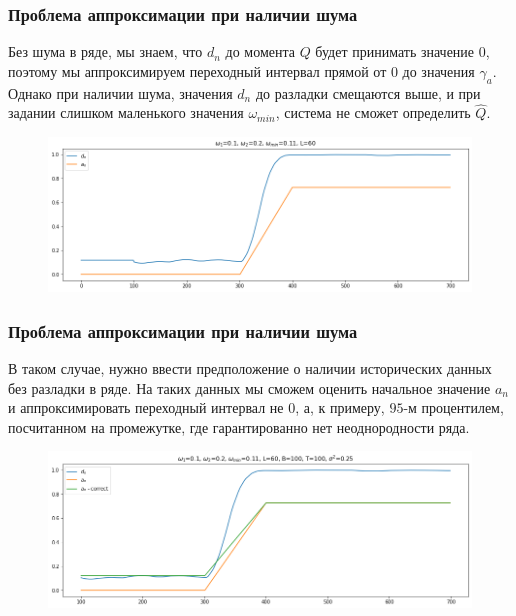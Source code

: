 \documentclass[11pt]{beamer}
\begin{document}
	\begin{frame}
		\frametitle{Проблема аппроксимации при наличии шума}
		Без шума в ряде, мы знаем, что $ d_{n} $ до момента $ Q $ будет принимать значение $ 0 $, поэтому мы аппроксимируем переходный интервал прямой от $ 0 $ до значения $ \gamma_a $. Однако при наличии шума, значения $ d_{n} $ до разладки смещаются выше, и при задании слишком маленького значения $ \omega_{min} $, система не сможет определить $ \hat{Q} $. 
		
		\begin{figure}[b]
			\centering
			\includegraphics[width=\linewidth]{imgs/noise_existance_problem.png}
		\end{figure}
	\end{frame}

	\begin{frame}
		\frametitle{Проблема аппроксимации при наличии шума}
		В таком случае, нужно ввести предположение о наличии исторических данных без разладки в ряде. На таких данных мы сможем оценить начальное значение $ a_n  $ и аппроксимировать переходный интервал не $ 0 $, а, к примеру, $ 95 $-м процентилем, посчитанном на промежутке, где гарантированно нет неоднородности ряда.
		\begin{figure}[b]
			\centering
			\includegraphics[width=\linewidth]{imgs/noise_existance_problem_solve.png}
		\end{figure}
	\end{frame}
\end{document}
